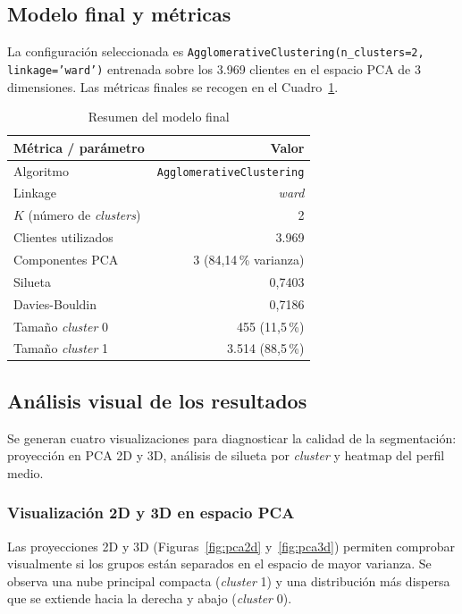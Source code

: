 \documentclass[11pt,a4paper]{article}
\begin{document}
\subsection{Modelo final y métricas}

La configuración seleccionada es \texttt{AgglomerativeClustering(n\_clusters=2, linkage='ward')} entrenada sobre los 3.969 clientes en el espacio PCA de 3 dimensiones. Las métricas finales se recogen en el Cuadro~\ref{tab:resumen_final}.

\begin{table}[h]
\centering
\caption{Resumen del modelo final}
\label{tab:resumen_final}
\begin{tabular}{lr}
\toprule
\textbf{Métrica / parámetro} & \textbf{Valor} \\
\midrule
Algoritmo & \texttt{AgglomerativeClustering} \\
Linkage & \textit{ward} \\
$K$ (número de \textit{clusters}) & 2 \\
Clientes utilizados & 3.969 \\
Componentes PCA & 3 (84,14\,\% varianza) \\
Silueta & 0,7403 \\
Davies-Bouldin & 0,7186 \\
Tamaño \textit{cluster} 0 & 455 (11,5\,\%) \\
Tamaño \textit{cluster} 1 & 3.514 (88,5\,\%) \\
\bottomrule
\end{tabular}
\end{table}

\subsection{Análisis visual de los resultados}

Se generan cuatro visualizaciones para diagnosticar la calidad de la segmentación: proyección en PCA 2D y 3D, análisis de silueta por \textit{cluster} y heatmap del perfil medio.

\subsubsection{Visualización 2D y 3D en espacio PCA}

Las proyecciones 2D y 3D (Figuras~\ref{fig:pca2d} y~\ref{fig:pca3d}) permiten comprobar visualmente si los grupos están separados en el espacio de mayor varianza. Se observa una nube principal compacta (\textit{cluster} 1) y una distribución más dispersa que se extiende hacia la derecha y abajo (\textit{cluster} 0).
\end{document}
